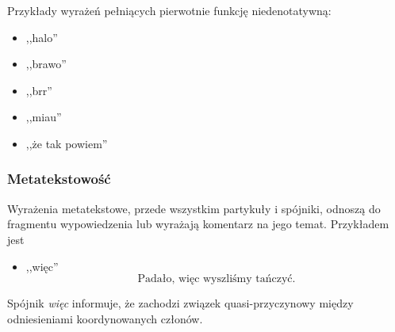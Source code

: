 \documentclass[a4paper, 12pt]{article}
\theoremstyle{remark}
\begin{document}
Przykłady wyrażeń pełniących pierwotnie funkcję niedenotatywną:
\begin{itemize}
	\item ,,halo''
	\item ,,brawo''
	\item ,,brr''
	\item ,,miau''
	\item ,,że tak powiem''
\end{itemize}

\subsubsection{Metatekstowość}
Wyrażenia metatekstowe, przede wszystkim partykuły i spójniki, odnoszą do fragmentu wypowiedzenia lub wyrażają komentarz na jego temat. Przykładem jest
\begin{itemize}
\item ,,więc''
\begin{equation}
	\text{Padało, więc wyszliśmy tańczyć.} 
\end{equation}
\end{itemize}
Spójnik \emph{więc} informuje, że zachodzi związek quasi-przyczynowy między odniesieniami koordynowanych członów.
\end{document}
